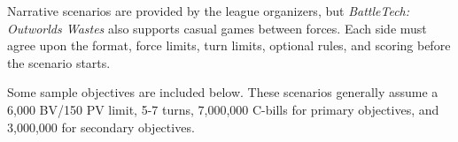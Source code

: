Narrative scenarios are provided by the league organizers, but \emph{BattleTech: Outworlds Wastes} also supports casual games between forces.
Each side must agree upon the format, force limits, turn limits, optional rules, and scoring before the scenario starts.

Some sample objectives are included below.
These scenarios generally assume a 6,000 BV/150 PV limit, 5-7 turns, 7,000,000 C-bills for primary objectives, and 3,000,000 for secondary objectives.
